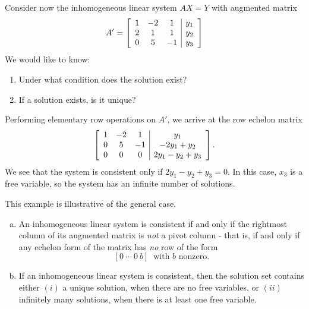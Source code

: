 \documentclass[12pt,letterpaper,reqno]{article}
\numberwithin{equation}{section}
\newcommand{\ti}[1]{\textit{#1}}
\newcommand{\fixme}[1]{{\color{orange}{[#1]}}}
\begin{document}
\begin{example}
Consider now the inhomogeneous linear system $AX=Y$ with augmented matrix
\begin{equation}\label{eq:inhom_general_example}
A'=\left[\begin{array}{c c c | c}
		1&-2&1&y_1 \\
			2&1&1&y_2 \\
			0&5&-1&y_3
	\end{array}\right]
\end{equation}
We would like to know:
\begin{enumerate}
	\item Under what condition does the solution exist?
	\item If a solution exists, is it unique?
\end{enumerate}
Performing elementary row operations on $A'$, we arrive at the row echelon matrix
\begin{equation}
	\left[\begin{array}{c c c | c}
		1&-2&1&y_1 \\
			0&5&-1&-2y_1+y_2 \\
			0&0&0&2y_1-y_2+y_3
	\end{array}\right].
\end{equation}
We see that the system is consistent only if $2y_1-y_2+y_3=0$. In this case, $x_3$ is a free variable, so the system has an infinite number of solutions.
\end{example}

This example is illustrative of the general case.

\begin{thm}\label{thm:existence_and_uniqueness_for_inhomogeneous_systems} \hspace{10cm}
\begin{enumerate}[(a)]
	\item An inhomogeneous linear system is consistent if and only if the rightmost column of its augmented matrix is \ti{not} a pivot column - that is, if and only if any echelon form of the matrix has \ti{no} row of the form
	$$[0 \ \cdots \ 0\  b] \ \text{ with $b$ nonzero.}$$
	\item If an inhomogeneous linear system is consistent, then the solution set contains either $(i)$ a unique solution, when there are no free variables, or $(ii)$ infinitely many solutions, when there is at least one free variable.
\end{enumerate}
\fixme{Include a formal proof? Details are very similar to the homogeneous case, with the obvious modifications.}
\end{thm}
\end{document}

